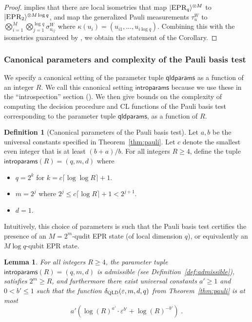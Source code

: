 \documentclass[11pt]{article}
\newtheorem{lemma}[theorem]{Lemma}
\theoremstyle{definition}
\newtheorem{definition}[theorem]{Definition}
\newcommand{\ket}[1]{|#1\rangle}
\newcommand{\eps}{\varepsilon}
\newcommand{\gamestyle}[1]{\ensuremath{\textsc{#1}}\xspace}
\newcommand{\qld}{\gamestyle{QLD}}
\newcommand{\labelstyle}[1]{\ensuremath{\textsc{#1}}\xspace}
\newcommand{\EPR}{\labelstyle{EPR}}
\newcommand{\qldparams}{\mathsf{qldparams}}
\newcommand{\introparams}{\mathsf{introparams}}
\begin{document}
\begin{proof}
 implies that there are local isometries that map $\ket{\EPR_q}^{\otimes M}$ to $\ket{\EPR_2}^{\otimes M\log q}$, and map the generalized Pauli measurements $\tau^W_u$ to $\bigotimes_{i=1}^M \bigotimes_{j=1}^{\log q} \sigma^W_{u_{ij}}$ where $\kappa(u_i) = (u_{i1},\ldots,u_{i\log q})$. Combining this with the isometries guaranteed by , we obtain the statement of the Corollary.
\end{proof}
\subsubsection{Canonical parameters and complexity of the Pauli basis test}
\label{sec:qld-complexity}

We specify a canonical setting of the parameter tuple $\qldparams$ as a function
of an integer $R$.
We call this canonical setting $\introparams$ because we use these in the
``introspection'' section ().
We then give bounds on the complexity of computing the decision procedure and CL
functions of the Pauli basis test corresponding to the parameter tuple
$\qldparams$, as a function of $R$.

\begin{definition}[Canonical parameters of the Pauli basis test]
  \label{def:introparams}
  Let $a,b$ be the universal constants specified in Theorem~\ref{thm:pauli}.
  Let $c$ denote the smallest even integer that is at least $(b + a)/b$.
  For all integers $R \geq 4$, define the tuple $\introparams(R) = (q,m,d)$
  where
  \begin{itemize}
  	\item $q = 2^k$ for $k = c \lceil  \log \log R  \rceil + 1$.
	\item $m = 2^j$ where $2^j \leq c \lceil \log R \rceil + 1 < 2^{j+1}$. 
	\item $d = 1$. 
  \end{itemize}
\end{definition}

Intuitively, this choice of parameters is such that the Pauli basis test
certifies the presence of an $M=2^m$-qudit EPR state (of local dimension $q$), or
equivalently an $M\log q$-qubit EPR state.

\begin{lemma}
  \label{lem:delta-bound}
 For all integers $R \geq 4$, the parameter tuple $\introparams(R) = (q,m,d)$ is
  admissible (see Definition~\ref{def:admissible}), satisfies $2^m \geq R$, and furthermore there exist
  universal constants $a'\geq 1$ and $0 < b' \leq 1$ such that the function
  $\delta_\qld(\eps, m, d, q)$ from Theorem~\ref{thm:pauli} is at most
   \[
   	a' ( \log(R)^{a'} \cdot \eps^{b'} + \log(R)^{-b'}) \;.
	\]
\end{lemma}
\end{document}
